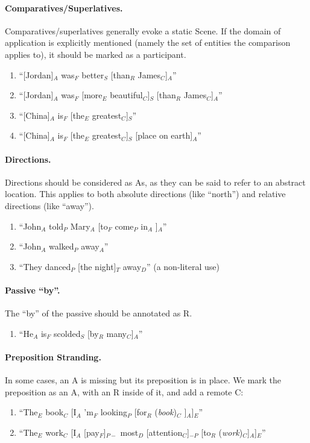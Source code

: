 \documentclass[11pt]{article}
\newcommand{\be}{\begin{enumerate}}
\newcommand{\ee}{\end{enumerate}}
\newcommand{\nss}[1]{{\color{magenta}{NSS: #1}}}
\newcommand{\rem}[1]{{(\it #1})}
\begin{document}
\paragraph{Comparatives/Superlatives.} Comparatives/superlatives generally evoke a static Scene. If the domain of application is explicitly mentioned (namely the set of entities the comparison applies to), it should be marked as a participant.
\be
\item
``[Jordan]$_A$ was$_F$ better$_S$ [than$_R$ James$_C$]$_A$''
\item
``[Jordan]$_A$ was$_F$ [more$_E$ beautiful$_C$]$_S$ [than$_R$ James$_C$]$_A$''
\item
``[China]$_A$ is$_F$ [the$_E$ greatest$_C$]$_S$''
\item
``[China]$_A$ is$_F$ [the$_E$ greatest$_C$]$_S$ [place on earth]$_A$''
\ee

\paragraph{Directions.} Directions should be considered as As, as they can be said to refer to an abstract location. This applies to both absolute directions (like ``north'') and relative directions (like ``away''). \nss{not sure I find this intuitive; they feel more adverbial to me. sometimes there's a clear location that can be inferred in context (``she came in/out''---presumably we have a reference point from context) but not always. E.g., ``the bird flew up'' can simply mean the bird is ascending, without an implicit source or goal.}
\be
\item
``John$_A$ told$_P$ Mary$_A$ [to$_F$ come$_P$ in$_A$ ]$_A$''
\item
``John$_A$ walked$_P$ away$_A$''
\item
``They danced$_P$ [the night]$_T$ away$_D$'' (a non-literal use)
\ee

\paragraph{Passive ``by''.} The ``by'' of the passive should be annotated as R.
\be \item
``He$_A$ is$_F$ scolded$_S$ [by$_R$ many$_C$]$_A$''
\ee
\nss{What if there's no by-phrase: is it implicit?}

\paragraph{Preposition Stranding.} In some cases, an A is missing but its preposition is in place. We mark the preposition as an A, with an R inside of it, and add a remote C:
\be \item
``The$_E$ book$_C$ [I$_A$ 'm$_F$ looking$_P$ [for$_R$ \rem{book}$_C$ ]$_A$]$_E$''
\item
``The$_E$ work$_C$ [I$_A$ [pay$_F$]$_{P-}$ most$_D$ [attention$_C$]$_{-P}$
[to$_R$ \rem{work}$_C$]$_{A}$]$_E$''
\ee
\end{document}
